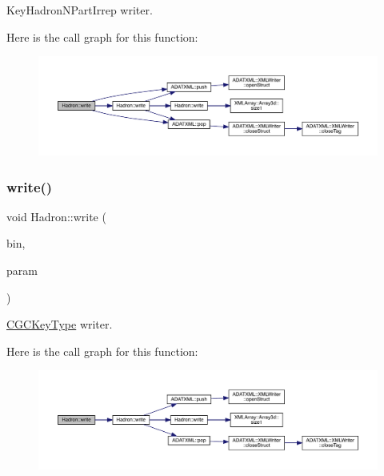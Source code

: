 Key\+Hadron\+N\+Part\+Irrep writer. 

Here is the call graph for this function\+:
\nopagebreak
\begin{figure}[H]
\begin{center}
\leavevmode
\includegraphics[width=350pt]{d1/daf/namespaceHadron_a649265e2213fc38a7907196da52300cd_cgraph}
\end{center}
\end{figure}
\mbox{\label{namespaceHadron_af206eaa349ec42352cb0a106dfd89c5b}} 
\subsubsection{\texorpdfstring{write()}{write()}\hspace{0.1cm}{\footnotesize\ttfamily [12/95]}}
{\footnotesize\ttfamily void Hadron\+::write (\begin{DoxyParamCaption}\item[{\mbox{\hyperlink{classADATIO_1_1BinaryWriter}{Binary\+Writer}} \&}]{bin,  }\item[{const \mbox{\hyperlink{structHadron_1_1KeyCGCSU3__t}{Key\+C\+G\+C\+S\+U3\+\_\+t}} \&}]{param }\end{DoxyParamCaption})}



\mbox{\hyperlink{structHadron_1_1CGCKeyType}{C\+G\+C\+Key\+Type}} writer. 

Here is the call graph for this function\+:
\nopagebreak
\begin{figure}[H]
\begin{center}
\leavevmode
\includegraphics[width=350pt]{d1/daf/namespaceHadron_af206eaa349ec42352cb0a106dfd89c5b_cgraph}
\end{center}
\end{figure}
\mbox{\label{namespaceHadron_a44eb64f50cbbc947364a538026c97ee6}} 

